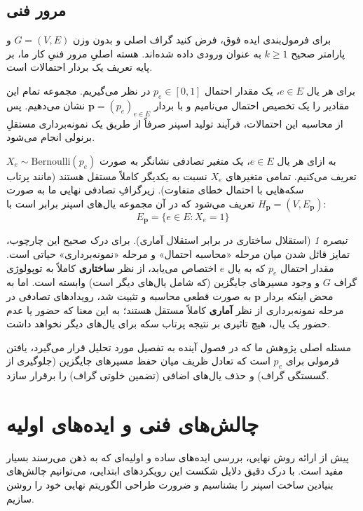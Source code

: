 \documentclass[11pt,a4paper]{report}
\theoremstyle{plain}
\theoremstyle{definition}
\theoremstyle{remark}
\newtheorem{rem}[thm]{\normalsize تبصره}
\begin{document}
\section{مرور فنی}
برای فرمول‌بندی ایده فوق، فرض کنید گراف اصلی و بدون وزن $G=(V,E)$ و پارامتر صحیح $k \ge 1$ به عنوان ورودی داده شده‌اند. هسته اصلیِ مرور فنیِ کار ما، بر پایه تعریف یک بردار احتمالات است.

برای هر یال $e \in E$، یک مقدار احتمال $p_e \in [0,1]$ در نظر می‌گیریم. مجموعه تمام این مقادیر را یک تخصیص احتمال می‌نامیم و با بردار $\mathbf{p} = (p_e)_{e \in E}$ نشان می‌دهیم. پس از محاسبه این احتمالات، فرآیند تولید اسپنر صرفاً از طریق یک نمونه‌برداری مستقلِ برنولی انجام می‌شود. 

به ازای هر یال $e \in E$، یک متغیر تصادفی نشانگر به صورت $X_e \sim \text{Bernoulli}(p_e)$ تعریف می‌کنیم. تمامی متغیرهای $X_e$ نسبت به یکدیگر کاملاً مستقل هستند (مانند پرتاب سکه‌هایی با احتمال خطای متفاوت). زیرگرافِ تصادفی نهایی ما به صورت $H_{\mathbf{p}} = (V, E_{\mathbf{p}})$ تعریف می‌شود که در آن مجموعه یال‌های اسپنر برابر است با:
\[ E_{\mathbf{p}} = \{e \in E : X_e = 1\} \]

\begin{rem}[استقلال ساختاری در برابر استقلال آماری]
برای درک صحیح این چارچوب، تمایز قائل شدن میان مرحله «محاسبه احتمال» و مرحله «نمونه‌برداری» حیاتی است. مقدار احتمال $p_e$ که به یال $e$ اختصاص می‌یابد، از نظر \textbf{ساختاری} کاملاً به توپولوژی گراف $G$ و وجود مسیرهای جایگزین (که شامل یال‌های دیگر است) وابسته است. اما به محض اینکه بردار $\mathbf{p}$ به صورت قطعی محاسبه و تثبیت شد، رویدادهای تصادفی در مرحله نمونه‌برداری از نظر \textbf{آماری} کاملاً مستقل هستند؛ به این معنا که حضور یا عدم حضور یک یال، هیچ تاثیری بر نتیجه پرتاب سکه برای یال‌های دیگر نخواهد داشت.
\end{rem}

مسئله اصلی پژوهش ما که در فصول آینده به تفصیل مورد تحلیل قرار می‌گیرد، یافتن فرمولی برای $p_e$ است که تعادل ظریف میان حفظ مسیرهای جایگزین (جلوگیری از گسستگی گراف) و حذف یال‌های اضافی (تضمین خلوتی گراف) را برقرار سازد.


\chapter{چالش‌های فنی و ایده‌های اولیه}
پیش از ارائه روش نهایی، بررسی ایده‌های ساده و اولیه‌ای که به ذهن می‌رسند بسیار مفید است. با درک دقیق دلایل شکست این رویکردهای ابتدایی، می‌توانیم چالش‌های بنیادین ساخت اسپنر را بشناسیم و ضرورت طراحی الگوریتم نهایی خود را روشن سازیم.
\end{document}
